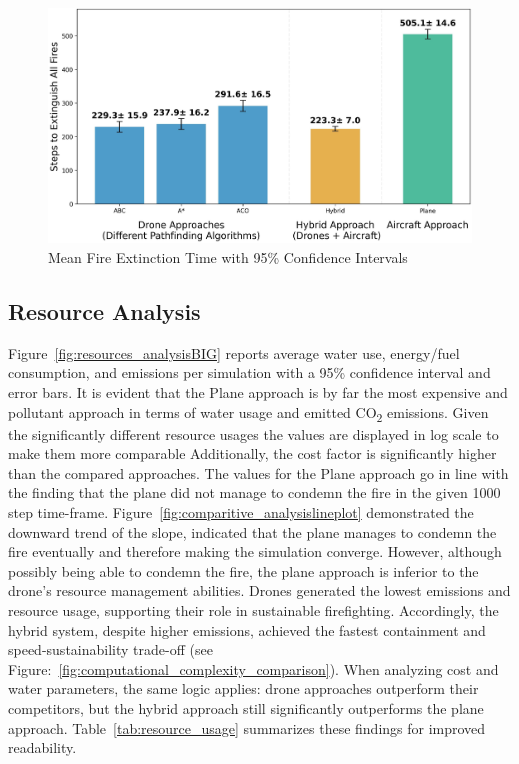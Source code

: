 \documentclass[11pt, a4paper]{article}
\begin{document}
\begin{figure}[htbp]
    \centering
    \includegraphics[width=1\linewidth]{figures/fire_extinction_comparison.jpeg}
    \caption{Mean Fire Extinction Time with 95\% Confidence Intervals}
    \label{fig:comparitive_analysis}
\end{figure}

\subsection{Resource Analysis}

Figure~\ref{fig:resources_analysisBIG} reports average water use, energy/fuel consumption, and emissions per simulation with a 95\% confidence interval and error bars. It is evident that the Plane approach is by far the most expensive and pollutant approach in terms of water usage and emitted CO\textsubscript{2} emissions. Given the significantly different resource usages the values are displayed in log scale to make them more comparable Additionally, the cost factor is significantly higher than the compared approaches. The values for the Plane approach go in line with the finding that the plane did not manage to condemn the fire in the given 1000 step time-frame. Figure~\ref{fig:comparitive_analysislineplot} demonstrated the downward trend of the slope, indicated that the plane manages to condemn the fire eventually and therefore making the simulation converge. However, although possibly being able to condemn the fire, the plane approach is inferior to the drone's resource management abilities. Drones generated the lowest emissions and resource usage, supporting their role in sustainable firefighting. Accordingly, the hybrid system, despite higher emissions, achieved the fastest containment and speed-sustainability trade-off (see Figure:~\ref{fig:computational_complexity_comparison}). When analyzing cost and water parameters, the same logic applies: drone approaches outperform their competitors, but the hybrid approach still significantly outperforms the plane approach. Table~\ref{tab:resource_usage} summarizes these findings for improved readability. 
\end{document}
